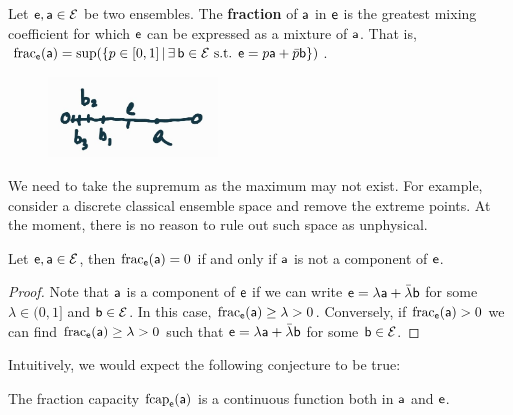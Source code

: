 \begin{mathSection}
	\begin{defn}
		Let $\ens, \ens[a] \in \Ens$ be two ensembles. The \textbf{fraction} of $\ens[a]$ in $\ens$ is the greatest mixing coefficient for which $\ens$ can be expressed as a mixture of $\ens[a]$. That is, $\fraction_{\ens}(\ens[a]) = \sup(\{ p \in [0,1] \, | \, \exists \, \ens[b] \in \Ens \text{ s.t. }  \ens = p \ens[a] + \bar{p} \ens[b] \})$.
	\end{defn}
\begin{figure}[H]
	\centering
	\includegraphics[width=0.4\textwidth]{tempimages/CapacitySupremum.jpg}
\end{figure}
	
	\begin{remark}
		We need to take the supremum as the maximum may not exist. For example, consider a discrete classical ensemble space and remove the extreme points. At the moment, there is no reason to rule out such space as unphysical.
	\end{remark}
	
	\begin{coro}
		Let $\ens, \ens[a] \in \Ens$, then $\fraction_{\ens}(\ens[a]) = 0$ if and only if $\ens[a]$ is not a component of $\ens$.
	\end{coro}
	
	\begin{proof}
		Note that $\ens[a]$ is a component of $\ens$ if we can write $\ens = \lambda \ens[a] + \bar{\lambda} \ens[b]$ for some $\lambda \in (0,1]$ and $\ens[b] \in \Ens$. In this case, $\fraction_{\ens}(\ens[a]) \geq \lambda > 0$. Conversely, if $\fraction_{\ens}(\ens[a]) > 0$ we can find $\fraction_{\ens}(\ens[a]) \geq \lambda > 0$ such that $\ens = \lambda \ens[a] + \bar{\lambda} \ens[b]$ for some $\ens[b] \in \Ens$.
	\end{proof}
\end{mathSection}

Intuitively, we would expect the following conjecture to be true:
\begin{conj}
	The fraction capacity $\fcap_{\ens}(\ens[a])$ is a continuous function both in $\ens[a]$ and $\ens$.
\end{conj}


